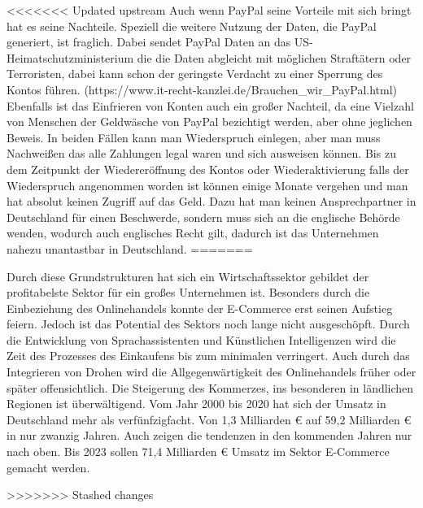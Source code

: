 <<<<<<< Updated upstream
Auch wenn PayPal seine Vorteile mit sich bringt hat es seine Nachteile. Speziell die weitere Nutzung der Daten, die PayPal generiert, ist fraglich. Dabei sendet PayPal Daten an das US-Heimatschutzministerium die die Daten abgleicht mit möglichen Straftätern oder Terroristen, dabei kann schon der geringste Verdacht zu einer Sperrung des Kontos führen. (https://www.it-recht-kanzlei.de/Brauchen_wir_PayPal.html) Ebenfalls ist das Einfrieren von Konten auch ein großer Nachteil, da eine Vielzahl von Menschen der Geldwäsche von PayPal bezichtigt werden, aber ohne jeglichen Beweis. In beiden Fällen kann man Wiederspruch einlegen, aber man muss Nachweißen das alle Zahlungen legal waren und sich ausweisen können. Bis zu dem Zeitpunkt der Wiedereröffnung des Kontos oder Wiederaktivierung falls der Wiederspruch angenommen worden ist können einige Monate vergehen und man hat absolut keinen Zugriff auf das Geld. Dazu hat man keinen Ansprechpartner in Deutschland für einen Beschwerde, sondern muss sich an die englische Behörde wenden, wodurch auch englisches Recht gilt, dadurch ist das Unternehmen nahezu unantastbar in Deutschland. 
=======




Durch diese Grundstrukturen hat sich ein Wirtschaftssektor gebildet der profitabelste Sektor für ein großes Unternehmen ist. Besonders durch die Einbeziehung des Onlinehandels konnte der E-Commerce erst seinen Aufstieg feiern. Jedoch ist das Potential des Sektors noch lange nicht ausgeschöpft. Durch die Entwicklung von Sprachassistenten und Künstlichen Intelligenzen wird die Zeit des Prozesses des Einkaufens bis zum minimalen verringert. Auch durch das Integrieren von Drohen wird die Allgegenwärtigkeit des Onlinehandels früher oder später offensichtlich. %
Die Steigerung des Kommerzes, ins besonderen in ländlichen Regionen ist überwältigend. Vom Jahr 2000 bis 2020 hat sich der Umsatz in Deutschland mehr als verfünfzigfacht. Von 1,3 Milliarden € auf 59,2 Milliarden € in nur zwanzig Jahren. %
Auch zeigen die tendenzen in den kommenden Jahren nur nach oben. Bis 2023 sollen 71,4 Milliarden € Umsatz im Sektor E-Commerce gemacht werden.       
 
>>>>>>> Stashed changes
